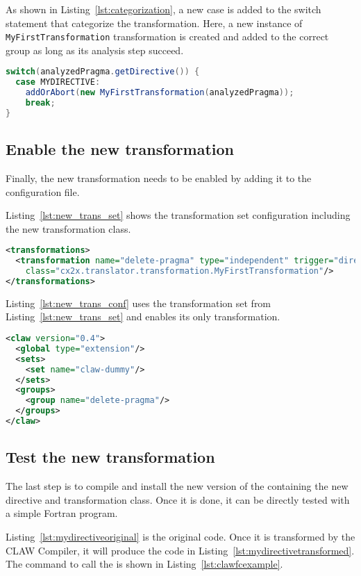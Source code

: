 As shown in Listing~\ref{lst:categorization}, a new case is added to the switch
statement that categorize the transformation. Here, a new instance of
\lstinline|MyFirstTransformation| transformation is created and added to the
correct group as long as its analysis step succeed.

\begin{lstlisting}[label=lst:categorization, caption=ClawXcodeMlTranslator.java, language=java]
switch(analyzedPragma.getDirective()) {
  case MYDIRECTIVE:
    addOrAbort(new MyFirstTransformation(analyzedPragma));
    break;
}
\end{lstlisting}


\subsection{Enable the new transformation}
Finally, the new transformation needs to be enabled by adding it to the
configuration file.

Listing~\ref{lst:new_trans_set} shows the transformation set configuration
including the new transformation class.


\begin{lstlisting}[label=lst:new_trans_set, caption=claw-dummy-set.xml, language=xml]
<transformations>
  <transformation name="delete-pragma" type="independent" trigger="directive"
    class="cx2x.translator.transformation.MyFirstTransformation"/>
</transformations>
\end{lstlisting}

Listing~\ref{lst:new_trans_conf} uses the transformation set from 
Listing~\ref{lst:new_trans_set} and enables its only transformation.

\begin{lstlisting}[label=lst:new_trans_conf, caption=claw-dummy.xml, language=xml]
<claw version="0.4">
  <global type="extension"/>
  <sets>
    <set name="claw-dummy"/>
  </sets>
  <groups>
    <group name="delete-pragma"/>
  </groups>
</claw>
\end{lstlisting}

\subsection{Test the new transformation}
The last step is to compile and install the new version of the \clawfcomp
containing the new directive and transformation class. Once it is done, it
can be directly tested with a simple Fortran program.

Listing~\ref{lst:mydirectiveoriginal} is the original code. Once it is
transformed by the CLAW Compiler, it will produce the code
in Listing~\ref{lst:mydirectivetransformed}. The command to call
the \clawfcomp is shown in Listing~\ref{lst:clawfcexample}.

